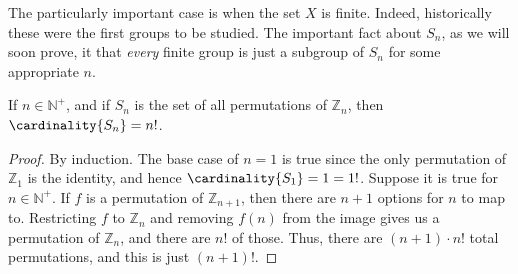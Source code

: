         The particularly important case is when the set $X$ is finite.
        Indeed, historically these were the first groups to be studied.
        The important fact about $S_{n}$, as we will soon prove, it that
        \textit{every} finite group is just a subgroup of $S_{n}$ for some
        appropriate $n$.
        \begin{theorem}
            \label{thm:Cardinality_of_Sn}%
            If $n\in\mathbb{N}^{+}$, and if $S_{n}$ is the set of all
            permutations of $\mathbb{Z}_{n}$, then $\cardinality{S_{n}}=n!$.
        \end{theorem}
        \begin{proof}
            By induction. The base case of $n=1$ is true since the only
            permutation of $\mathbb{Z}_{1}$ is the identity, and hence
            $\cardinality{S_{1}}=1=1!$. Suppose it is true for
            $n\in\mathbb{N}^{+}$. If $f$ is a permutation of
            $\mathbb{Z}_{n+1}$, then there are $n+1$ options for $n$ to map
            to. Restricting $f$ to $\mathbb{Z}_{n}$ and removing $f(n)$ from
            the image gives us a permutation of $\mathbb{Z}_{n}$, and there
            are $n!$ of those. Thus, there are $(n+1)\cdot{n}!$ total
            permutations, and this is just $(n+1)!$.
        \end{proof}
